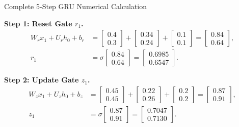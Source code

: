 \documentclass[a4paper,11pt]{article}
\begin{document}
\begin{worked}{Complete 5-Step GRU Numerical Calculation}
\begin{steps}
  \item \textbf{Step 1: Reset Gate $r_1$.}
        \begin{align*}
          W_r x_1 + U_r h_0 + b_r &= \begin{bmatrix} 0.4 \\ 0.3 \end{bmatrix} + \begin{bmatrix} 0.34 \\ 0.24 \end{bmatrix} + \begin{bmatrix} 0.1 \\ 0.1 \end{bmatrix} = \begin{bmatrix} 0.84 \\ 0.64 \end{bmatrix}, \\
          r_1 &= \sigma\begin{bmatrix} 0.84 \\ 0.64 \end{bmatrix} = \begin{bmatrix} 0.6985 \\ 0.6547 \end{bmatrix}.
        \end{align*}
  \item \textbf{Step 2: Update Gate $z_1$.}
        \begin{align*}
          W_z x_1 + U_z h_0 + b_z &= \begin{bmatrix} 0.45 \\ 0.45 \end{bmatrix} + \begin{bmatrix} 0.22 \\ 0.26 \end{bmatrix} + \begin{bmatrix} 0.2 \\ 0.2 \end{bmatrix} = \begin{bmatrix} 0.87 \\ 0.91 \end{bmatrix}, \\
          z_1 &= \sigma\begin{bmatrix} 0.87 \\ 0.91 \end{bmatrix} = \begin{bmatrix} 0.7047 \\ 0.7130 \end{bmatrix}.
        \end{align*}

\end{steps}
\end{worked}
\end{document}
